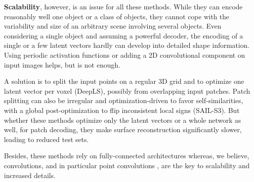 \documentclass[10pt,twocolumn,letterpaper]{article}
\begin{document}
\textbf{Scalability}, however, is an issue for all these methods. While they can encode reasonably well one object or a class of objects, they cannot cope with the variability and size of an arbitrary scene involving several objects. Even considering a single object and assuming a powerful decoder, the encoding of a single or a few latent vectors hardly can develop into detailed shape information. Using periodic activation functions \cite{Sitzmann2019siren, Tancik2020Fourier} or adding a 2D convolutional component on input images \cite{Saito2019ICCV, Xu2019NIPS} helps, but is not enough.

A solution is to split the input points on a regular 3D grid and to optimize one latent vector per voxel \cite{Chabra2020DeepLS} (DeepLS), possibly from overlapping input patches. Patch splitting can also be irregular and optimization-driven to favor self-similarities, with a global post-optimization to flip inconsistent local signs \cite{Zhao2021SignAgnostic} (SAIL-S3). But whether these methods optimize only the latent vectors or a whole network as well, for patch decoding, they make surface reconstruction significantly slower, leading to reduced test sets.

Besides, these methods rely on fully-connected architectures whereas, we believe, convolutions, and in particular point convolutions \cite{Hua2018CVPR, Wang2018CVPR, Xu2018ECCV, li2018NeurIPS, Liu2019CVPR, Wu2019CVPR, Mao2019ICCV, Thomas2019ICCV, Boulch2020CG, Boulch2020ACCV}, are the key to scalability and increased details.
\end{document}
